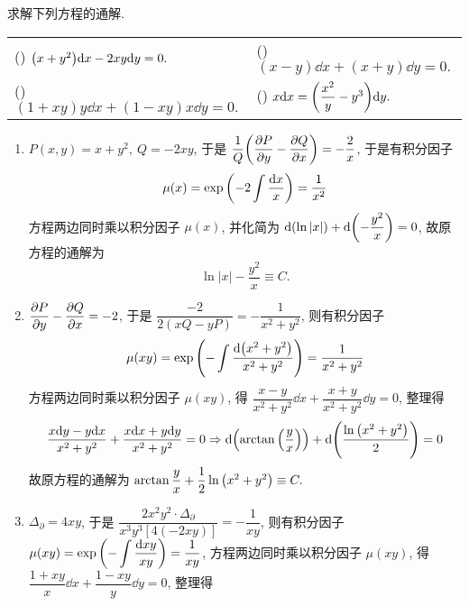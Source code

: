 \begin{example}
    求解下列方程的通解.
    \setcounter{magicrownumbers}{0}
    \begin{table}[H]
        \centering
        \begin{tabular}{l | l}
            (\rownumber{}) $\qty(x+y^2)\dd x-2xy\dd y=0.$ & (\rownumber{}) $(x-y)\dd x+(x+y)\dd y=0.$              \\
            (\rownumber{}) $(1+xy)y\dd x+(1-xy)x\dd y=0.$ & (\rownumber{}) $x\dd x=\qty(\dfrac{x^2}{y}-y^3)\dd y.$ \\
        \end{tabular}
    \end{table}
\end{example}
\begin{solution}
    \begin{enumerate}[label=(\arabic{*})]
        \item $P(x,y)=x+y^2,~Q=-2xy$, 于是 $\dfrac{1}{Q}\qty(\displaystyle\pdv{P}{y}-\pdv{Q}{x})=-\dfrac{2}{x}$, 
              于是有积分因子 $$\mu(x)=\exp\qty(-2\displaystyle\int\dfrac{\dd x}{x})=\dfrac{1}{x^2}$$
              方程两边同时乘以积分因子 $\mu(x)$, 并化简为 $\dd \qty(\ln|x|)+\dd \qty(-\dfrac{y^2}{x})=0$, 故原方程的通解为 $$\ln|x|-\dfrac{y^2}{x}\equiv C.$$
        \item $\displaystyle\pdv{P}{y}-\pdv{Q}{x}=-2$, 于是 $\dfrac{-2}{2(xQ-yP)}=-\dfrac{1}{x^2+y^2}$, 则有积分因子 $$\mu(xy)=\exp\qty(-\displaystyle\int\dfrac{\dd \qty(x^2+y^2)}{x^2+y^2})=\dfrac{1}{x^2+y^2}$$
              方程两边同时乘以积分因子 $\mu(xy)$, 得 $\dfrac{x-y}{x^2+y^2}\dd x+\dfrac{x+y}{x^2+y^2}\dd y=0$, 
              整理得 $$\dfrac{x\dd y-y\dd x}{x^2+y^2}+\dfrac{x\dd x+y\dd y}{x^2+y^2}=0\Rightarrow \dd \qty(\arctan\qty(\dfrac{y}{x}))+\dd \qty(\dfrac{\ln\qty(x^2+y^2)}{2})=0$$
              故原方程的通解为 $\arctan\dfrac{y}{x}+\dfrac{1}{2}\ln\qty(x^2+y^2)\equiv C.$
        \item $\Delta_\partial=4xy$, 于是 $\dfrac{2x^2y^2\cdot\Delta_\partial}{x^3y^3[4(-2xy)]}=-\dfrac{1}{xy}$, 则有积分因子 $\mu(xy)=\exp\qty(-\displaystyle\int\dfrac{\dd xy}{xy})=\dfrac{1}{xy}$, 
              方程两边同时乘以积分因子 $\mu(xy)$, 得 $\dfrac{1+xy}{x}\dd x+\dfrac{1-xy}{y}\dd y=0$, 整理得
\end{enumerate}
\end{solution}
